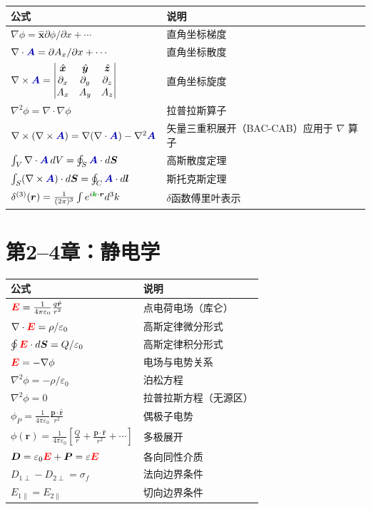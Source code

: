 \documentclass[11pt,a4paper,openany,oneside]{book}
\newcommand{\vecE}{\textcolor{red}{\vect{E}}}
\newcommand{\vecK}{\textcolor{green!60!black}{\vect{k}}}
\newcommand{\vecA}{\textcolor{blue!70!black}{\vect{A}}}
\newcommand{\eps}{\varepsilon}
\newcommand{\vect}[1]{\bm{#1}}
\newcommand{\unitvec}[1]{\hat{\vect{#1}}}
\newcommand{\grad}{\nabla}
\newcommand{\curl}{\nabla\times}
\newcommand{\divg}{\nabla\cdot}
\newcommand{\lap}{\nabla^2}
\begin{document}
\begin{center}
\begin{tabular}{@{}ll@{}}
\toprule
\textbf{公式} & \textbf{说明} \\
\midrule
$\grad\phi = \unitvec{x}\partial\phi/\partial x + \cdots$ & 直角坐标梯度 \\
$\divg\vecA = \partial A_x/\partial x + \cdots$ & 直角坐标散度 \\
$\curl\vecA = \begin{vmatrix}\unitvec{x}&\unitvec{y}&\unitvec{z}\\\partial_x&\partial_y&\partial_z\\A_x&A_y&A_z\end{vmatrix}$ & 直角坐标旋度 \\
$\lap\phi = \divg\grad\phi$ & 拉普拉斯算子 \\
$\nabla\times(\nabla\times\vecA) = \grad(\divg\vecA) - \lap\vecA$ & 矢量三重积展开（BAC-CAB）应用于 $\nabla$ 算子 \\
$\int_V \divg\vecA\,dV = \oint_S \vecA\cdot d\vect{S}$ & 高斯散度定理 \\
$\int_S (\curl\vecA)\cdot d\vect{S} = \oint_C \vecA\cdot d\vect{l}$ & 斯托克斯定理 \\
$\delta^{(3)}(\vect{r}) = \frac{1}{(2\pi)^3}\int e^{i\vecK\cdot\vect{r}}d^3k$ & $\delta$函数傅里叶表示 \\
\bottomrule
\end{tabular}
\end{center}

\section{第2--4章：静电学}

\begin{center}
\begin{tabular}{@{}ll@{}}
\toprule
\textbf{公式} & \textbf{说明} \\
\midrule
$\vecE=\frac{1}{4\pi\eps_0}\frac{q\unitvec{r}}{r^2}$ & 点电荷电场（库仑） \\
$\divg\vecE=\rho/\eps_0$ & 高斯定律微分形式 \\
$\oint\vecE\cdot d\vect{S}=Q/\eps_0$ & 高斯定律积分形式 \\
$\vecE=-\grad\phi$ & 电场与电势关系 \\
$\lap\phi=-\rho/\eps_0$ & 泊松方程 \\
$\lap\phi=0$ & 拉普拉斯方程（无源区） \\
$\phi_P=\frac{1}{4\pi\eps_0}\frac{\vect{p}\cdot\unitvec{r}}{r^2}$ & 偶极子电势 \\
$\phi(\vect{r})=\frac{1}{4\pi\eps_0}\left[\frac{Q}{r}+\frac{\vect{p}\cdot\unitvec{r}}{r^2}+\cdots\right]$ & 多极展开 \\
$\vect{D}=\eps_0\vecE+\vect{P}=\eps\vecE$ & 各向同性介质 \\
$D_{1\perp}-D_{2\perp}=\sigma_f$ & 法向边界条件 \\
$E_{1\parallel}=E_{2\parallel}$ & 切向边界条件 \\
\bottomrule
\end{tabular}
\end{center}
\end{document}
